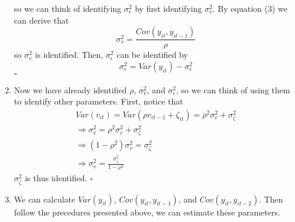 \documentclass[12pt]{article}
\newcommand*{\QEDA}{\null\nobreak\hfill\ensuremath{\square}}%
\begin{document}
\begin{enumerate}
            so we can think of identifying $\sigma^2_\epsilon$ by first identifying $\sigma^2_v$. 
            By equation (3) we can derive that $$\sigma^2_v = \frac{Cov(y_{it}, y_{it-1})}{\rho}$$
            so $\sigma^2_v$ is identified. Then, $\sigma^2_\epsilon$ can be identified by 
            $$\sigma^2_\epsilon = Var(y_{it}) - \sigma^2_\epsilon$$ \QEDA
      \item Now we have already identified $\rho$, $\sigma^2_v$, and $\sigma^2_\epsilon$, so we can think of using them to identify other parameters.
      First, notice that 
      \begin{align}
            & Var(v_{it})                         = Var(\rho v_{it-1} + \zeta_{it}) = \rho^2 \sigma^2_v + \sigma^2_\zeta & \nonumber \\ 
            & \Rightarrow \sigma^2_v              = \rho^2 \sigma^2_v + \sigma^2_\zeta & \nonumber \\ 
            & \Rightarrow (1 - \rho^2) \sigma^2_v = \sigma^2_\zeta & \nonumber \\ 
            & \Rightarrow \sigma^2_v = \frac{\sigma^2_\zeta}{1 - \rho^2} & \nonumber
      \end{align}
      $\sigma^2_\zeta$ is thus identified. \QEDA
      \item We can calculate $Var(y_{it})$, $Cov(y_{it}, y_{it-1})$, and $Cov(y_{it}, y_{it-2})$. Then follow the precedures presented above, we can estimate these parameters.
\end{enumerate}
\end{document}
